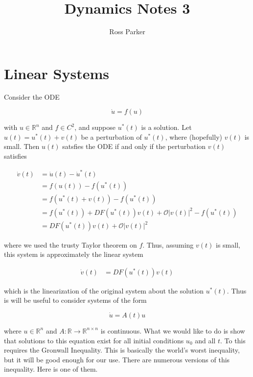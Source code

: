 \documentclass{article}
\title{Dynamics Notes 3}
\author{Ross Parker}
\def\R{{\mathbb R}}
\begin{document}
\section{Linear Systems}

Consider the ODE

\[
\dot{u} = f(u)
\]

with $u \in \R^n$ and $f \in C^2$, and suppose $u^*(t)$ is a solution. Let $u(t) = u^*(t) + v(t)$ be a perturbation of $u^*(t)$, where (hopefully) $v(t)$ is small. Then $u(t)$ satsfies the ODE if and only if the perturbation $v(t)$ satisfies

\begin{align*}
\dot{v}(t) &= \dot{u}(t) - \dot{u}^*(t) \\
&= f(u(t)) - f(u^*(t)) \\
&= f(u^*(t) + v(t)) - f(u^*(t)) \\
&= f(u^*(t)) + DF(u^*(t))v(t) + \mathcal{O}|v(t)|^2 - f(u^*(t)) \\
&= DF(u^*(t))v(t) + \mathcal{O}|v(t)|^2 
\end{align*}

where we used the trusty Taylor theorem on $f$. Thus, assuming $v(t)$ is small, this system is approximately the linear system

\begin{align*}
\dot{v}(t) &= DF(u^*(t))v(t) 
\end{align*}

which is the linearization of the original system about the solution $u^*(t)$. Thus is will be useful to consider systems of the form

\[
\dot{u} = A(t) u
\]

where $u \in \R^n$ and $A:\R \rightarrow \R^{n \times n}$ is continuous. What we would like to do is show that solutions to this equation exist for all initial conditions $u_0$ and all $t$. To this requires the Gronwall Inequality. This is basically the world's worst inequality, but it will be good enough for our use. There are numerous versions of this inequality. Here is one of them.
\end{document}

